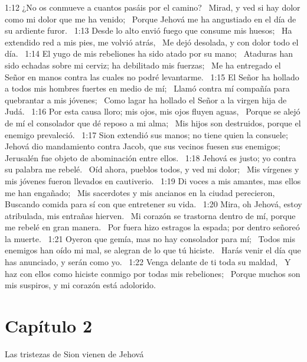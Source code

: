 1:12 ¿No os conmueve a cuantos pasáis por el camino?  
Mirad, y ved si hay dolor como mi dolor que me ha venido;  
Porque Jehová me ha angustiado en el día de su ardiente furor.  
1:13 Desde lo alto envió fuego que consume mis huesos;  
Ha extendido red a mis pies, me volvió atrás,  
Me dejó desolada, y con dolor todo el día.  
1:14 El yugo de mis rebeliones ha sido atado por su mano;  
Ataduras han sido echadas sobre mi cerviz; ha debilitado mis fuerzas;  
Me ha entregado el Señor en manos contra las cuales no podré levantarme.  
1:15 El Señor ha hollado a todos mis hombres fuertes en medio de mí;  
Llamó contra mí compañía para quebrantar a mis jóvenes;  
Como lagar ha hollado el Señor a la virgen hija de Judá.  
1:16 Por esta causa lloro; mis ojos, mis ojos fluyen aguas,  
Porque se alejó de mí el consolador que dé reposo a mi alma;  
Mis hijos son destruidos, porque el enemigo prevaleció.  
1:17 Sion extendió sus manos; no tiene quien la consuele;  
Jehová dio mandamiento contra Jacob, que sus vecinos fuesen sus enemigos;  
Jerusalén fue objeto de abominación entre ellos.  
1:18 Jehová es justo; yo contra su palabra me rebelé.  
Oíd ahora, pueblos todos, y ved mi dolor;  
Mis vírgenes y mis jóvenes fueron llevados en cautiverio.  
1:19 Di voces a mis amantes, mas ellos me han engañado;  
Mis sacerdotes y mis ancianos en la ciudad perecieron,  
Buscando comida para sí con que entretener su vida.  
1:20 Mira, oh Jehová, estoy atribulada, mis entrañas hierven.  
Mi corazón se trastorna dentro de mí, porque me rebelé en gran manera.  
Por fuera hizo estragos la espada; por dentro señoreó la muerte.  
1:21 Oyeron que gemía, mas no hay consolador para mí;  
Todos mis enemigos han oído mi mal, se alegran de lo que tú hiciste.  
Harás venir el día que has anunciado, y serán como yo.  
1:22 Venga delante de ti toda su maldad,  
Y haz con ellos como hiciste conmigo por todas mis rebeliones;  
Porque muchos son mis suspiros, y mi corazón está adolorido.  
\section*{Capítulo 2}
Las tristezas de Sion vienen de Jehová  

